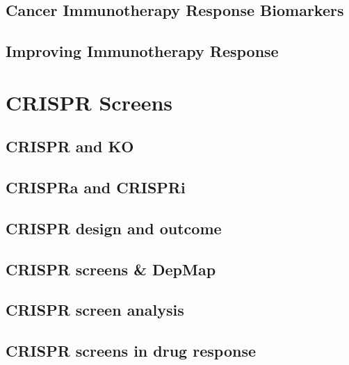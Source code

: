 \documentclass[
]{book}
\begin{document}
\hypertarget{cancer-immunotherapy-response-biomarkers}{%
\section{Cancer Immunotherapy Response Biomarkers}\label{cancer-immunotherapy-response-biomarkers}}

\hypertarget{improving-immunotherapy-response}{%
\section{Improving Immunotherapy Response}\label{improving-immunotherapy-response}}

\hypertarget{crispr}{%
\chapter{CRISPR Screens}\label{crispr}}

\hypertarget{crispr-and-ko}{%
\section{CRISPR and KO}\label{crispr-and-ko}}

\hypertarget{crispra-and-crispri}{%
\section{CRISPRa and CRISPRi}\label{crispra-and-crispri}}

\hypertarget{crispr-design-and-outcome}{%
\section{CRISPR design and outcome}\label{crispr-design-and-outcome}}

\hypertarget{crispr-screens-depmap}{%
\section{CRISPR screens \& DepMap}\label{crispr-screens-depmap}}

\hypertarget{crispr-screen-analysis}{%
\section{CRISPR screen analysis}\label{crispr-screen-analysis}}

\hypertarget{crispr-screens-in-drug-response}{%
\section{CRISPR screens in drug response}\label{crispr-screens-in-drug-response}}
\end{document}
